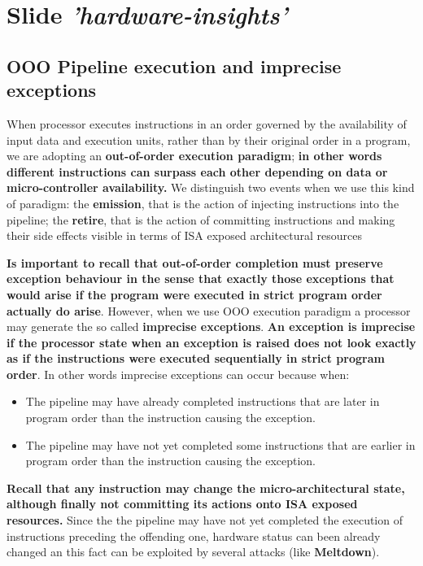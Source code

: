\documentclass[10pt,a4paper]{article}
\begin{document}
\section{Slide \textit{'hardware-insights'}}

\subsection{OOO Pipeline execution and imprecise exceptions}

When processor executes instructions in an order governed by the availability of input data and execution units, rather than by their original order in a program, we are adopting an \textbf{out-of-order execution paradigm}; \textbf{in other words different instructions can surpass each other depending on data or micro-controller availability.} We distinguish two events when we use this kind of paradigm: the \textbf{emission}, that is the action of injecting instructions into the pipeline; the \textbf{retire}, that is the action of committing instructions and making their side effects visible in terms of ISA exposed architectural resources

\textbf{Is important to recall that out-of-order completion must preserve exception behaviour in the sense that exactly those exceptions that would arise if the program were executed in strict program order actually do arise}. However, when we use OOO execution paradigm a processor may generate the so called \textbf{imprecise exceptions}. \textbf{An exception is imprecise if the processor state  when  an  exception  is  raised  does  not  look  exactly  as  if  the instructions were executed sequentially in strict program order}. In other words imprecise exceptions can occur because when:

\begin{itemize}
\item The pipeline may have already completed instructions that are later in program order than the instruction causing the exception.
\item The pipeline may have not yet completed some instructions that are earlier in program order than the instruction causing the exception.
\end{itemize}

\textbf{Recall that any instruction may change the micro-architectural state, although finally not committing its actions onto ISA exposed resources.} Since the the pipeline may have not yet completed the execution of instructions preceding the offending one, hardware status can been already changed an this fact can be exploited by several attacks (like \textbf{Meltdown}).
\end{document}
